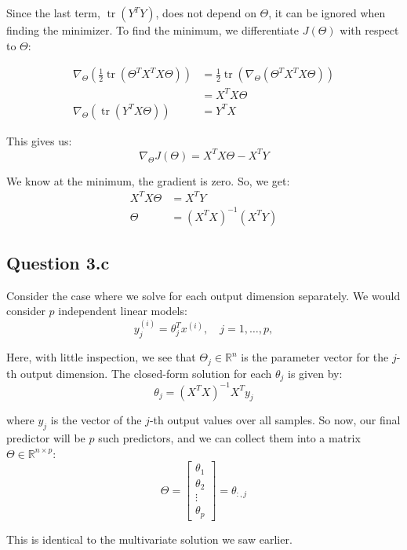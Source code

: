 \documentclass[a4paper]{article}
\begin{document}
\noindent Since the last term, \(\operatorname{tr}(Y^T Y)\), does not depend on \(\Theta\), it can be ignored when finding the minimizer. To find the minimum, we differentiate \(J(\Theta)\) with respect to \(\Theta\):

\begin{align*}
    \nabla_\Theta \left(\frac{1}{2}\operatorname{tr}\left(\Theta^T X^T X \Theta\right)\right) &= \frac{1}{2}\operatorname{tr}\left(\nabla_\Theta \left(\Theta^TX^T X \Theta\right)\right) \\
    &= X^T X \Theta \\
    \nabla_\Theta \left(\operatorname{tr}\left(Y^T X \Theta\right)\right) &= Y^T X
\end{align*}

\noindent This gives us:
\[
\nabla_\Theta J(\Theta) = X^T X \Theta - X^T Y
\]

\noindent We know at the minimum, the gradient is zero. So, we get:
\begin{align*}
    X^T X \Theta &= X^T Y \\
    \Theta &= \left(X^T X\right)^{-1} \left(X^T Y\right)
\end{align*}


\newpage
\subsection*{Question 3.c}
Consider the case where we solve for each output dimension separately. We would consider \(p\) independent linear models:
\[
y_j^{(i)} = \theta_j^T x^{(i)}, \quad j = 1,\ldots,p,
\]

\vspace{2mm}
\noindent Here, with little inspection, we see that $\Theta_j \in \mathbb{R}^n$ is the parameter vector for the $j$-th output dimension. The closed-form solution for each $\theta_j$ is given by:
\[
\theta_j = (X^T X)^{-1} X^T y_j
\]

\noindent where $y_j$ is the vector of the $j$-th output values over all samples. So now, our final predictor will be $p$ such predictors, and we can collect them into a matrix $\Theta \in \mathbb{R}^{n \times p}$:
\[
\Theta = \begin{bmatrix} \theta_1 \\ \theta_2 \\ \vdots \\ \theta_p \end{bmatrix} = \theta_{:, j}
\]

\noindent This is identical to the multivariate solution we saw earlier.
\end{document}
